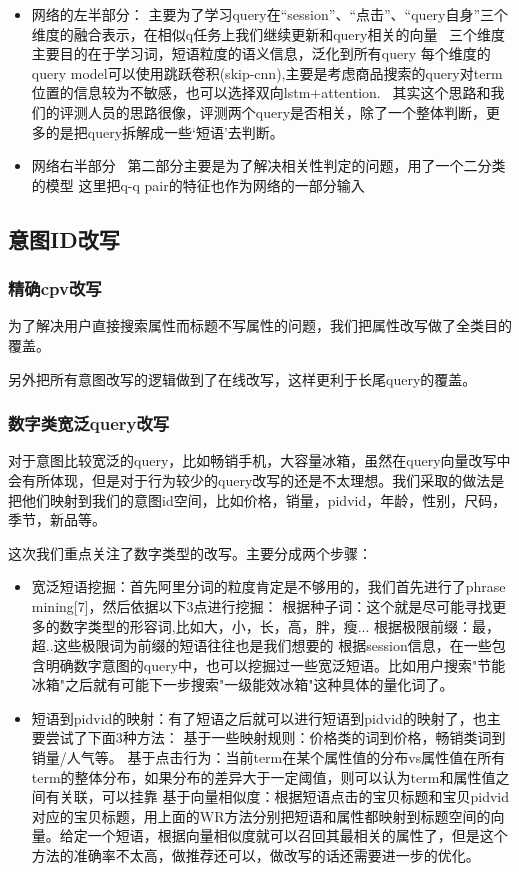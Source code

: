 \begin{itemize}
\item 网络的左半部分：
主要为了学习query在“session”、“点击”、“query自身”三个维度的融合表示，在相似q任务上我们继续更新和query相关的向量
 三个维度主要目的在于学习词，短语粒度的语义信息，泛化到所有query
每个维度的query model可以使用跳跃卷积(skip-cnn),主要是考虑商品搜索的query对term位置的信息较为不敏感，也可以选择双向lstm+attention. 
其实这个思路和我们的评测人员的思路很像，评测两个query是否相关，除了一个整体判断，更多的是把query拆解成一些‘短语’去判断。
\item 网络右半部分 
第二部分主要是为了解决相关性判定的问题，用了一个二分类的模型
这里把q-q pair的特征也作为网络的一部分输入
\end{itemize}

\subsection{意图ID改写}
\subsubsection{精确cpv改写}
为了解决用户直接搜索属性而标题不写属性的问题，我们把属性改写做了全类目的覆盖。
\par 另外把所有意图改写的逻辑做到了在线改写，这样更利于长尾query的覆盖。 

\subsubsection{数字类宽泛query改写}
对于意图比较宽泛的query，比如畅销手机，大容量冰箱，虽然在query向量改写中会有所体现，但是对于行为较少的query改写的还是不太理想。我们采取的做法是把他们映射到我们的意图id空间，比如价格，销量，pidvid，年龄，性别，尺码，季节，新品等。
\par 这次我们重点关注了数字类型的改写。主要分成两个步骤：
\begin{itemize}
\item 宽泛短语挖掘：首先阿里分词的粒度肯定是不够用的，我们首先进行了phrase mining[7]，然后依据以下3点进行挖掘：
根据种子词：这个就是尽可能寻找更多的数字类型的形容词,比如{大，小，长，高，胖，瘦...}
根据极限前缀：{最，超..}这些极限词为前缀的短语往往也是我们想要的
根据session信息，在一些包含明确数字意图的query中，也可以挖掘过一些宽泛短语。比如用户搜索"节能冰箱"之后就有可能下一步搜索"一级能效冰箱"这种具体的量化词了。
\item 短语到pidvid的映射：有了短语之后就可以进行短语到pidvid的映射了，也主要尝试了下面3种方法：
基于一些映射规则：价格类的词到价格，畅销类词到销量/人气等。
基于点击行为：当前term在某个属性值的分布vs属性值在所有term的整体分布，如果分布的差异大于一定阈值，则可以认为term和属性值之间有关联，可以挂靠
基于向量相似度：根据短语点击的宝贝标题和宝贝pidvid对应的宝贝标题，用上面的WR方法分别把短语和属性都映射到标题空间的向量。给定一个短语，根据向量相似度就可以召回其最相关的属性了，但是这个方法的准确率不太高，做推荐还可以，做改写的话还需要进一步的优化。
\end{itemize}

